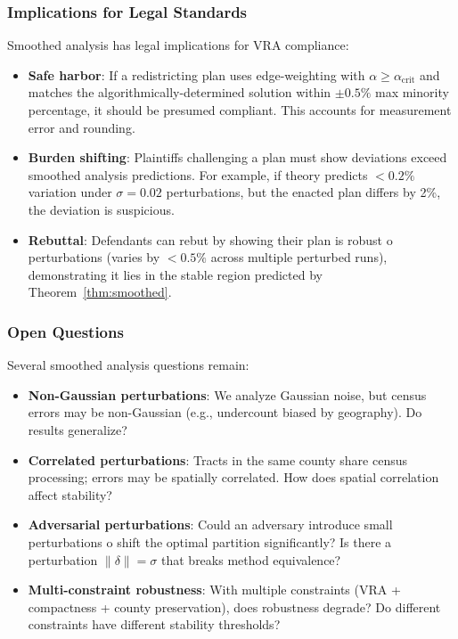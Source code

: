 \subsubsection{Implications for Legal Standards}

Smoothed analysis has legal implications for VRA compliance:

\begin{itemize}
    \item \textbf{Safe harbor}: If a redistricting plan uses edge-weighting with $\alpha \geq \alpha_{\text{crit}}$ and matches the algorithmically-determined solution within $\pm 0.5\%$ max minority percentage, it should be presumed compliant. This accounts for measurement error and rounding.

    \item \textbf{Burden shifting}: Plaintiffs challenging a plan must show deviations exceed smoothed analysis predictions. For example, if theory predicts $< 0.2\%$ variation under $\sigma = 0.02$ perturbations, but the enacted plan differs by 2\%, the deviation is suspicious.

    \item \textbf{Rebuttal}: Defendants can rebut by showing their plan is robust 	o perturbations (varies by $< 0.5\%$ across multiple perturbed runs), demonstrating it lies in the stable region predicted by Theorem~\ref{thm:smoothed}.
\end{itemize}

\subsubsection{Open Questions}

Several smoothed analysis questions remain:

\begin{itemize}
    \item \textbf{Non-Gaussian perturbations}: We analyze Gaussian noise, but census errors may be non-Gaussian (e.g., undercount biased by geography). Do results generalize?

    \item \textbf{Correlated perturbations}: Tracts in the same county share census processing; errors may be spatially correlated. How does spatial correlation affect stability?

    \item \textbf{Adversarial perturbations}: Could an adversary introduce small perturbations 	o shift the optimal partition significantly? Is there a perturbation $\|\delta\| = \sigma$ that breaks method equivalence?

    \item \textbf{Multi-constraint robustness}: With multiple constraints (VRA + compactness + county preservation), does robustness degrade? Do different constraints have different stability thresholds?
\end{itemize}

